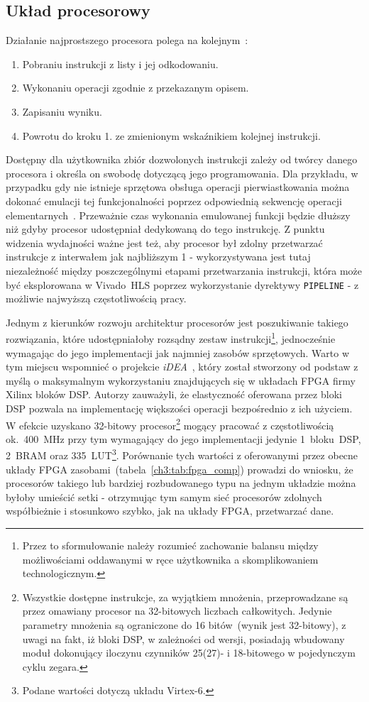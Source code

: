 \subsection{Układ procesorowy}
Działanie najprostszego procesora polega na kolejnym~\cite{RISCV}:
\begin{enumerate}
\item Pobraniu instrukcji z listy i jej odkodowaniu.
\item Wykonaniu operacji zgodnie z przekazanym opisem.
\item Zapisaniu wyniku.
\item Powrotu do kroku 1. ze zmienionym wskaźnikiem kolejnej instrukcji.
\end{enumerate}
Dostępny dla użytkownika zbiór dozwolonych instrukcji zależy od twórcy danego procesora i określa on swobodę dotyczącą jego programowania. Dla przykładu, w przypadku gdy nie istnieje sprzętowa obsługa operacji pierwiastkowania można dokonać emulacji tej funkcjonalności poprzez odpowiednią sekwencję operacji elementarnych~\cite{FAST_INV_SQRT}. Przeważnie czas wykonania emulowanej funkcji będzie dłuższy niż gdyby procesor udostępniał dedykowaną do tego instrukcję. Z punktu widzenia wydajności ważne jest też, aby procesor był zdolny przetwarzać instrukcje z interwałem jak najbliższym 1 - wykorzystywana jest tutaj niezależność między poszczególnymi etapami przetwarzania instrukcji, która może być eksplorowana w Vivado~HLS poprzez wykorzystanie dyrektywy \texttt{PIPELINE} - z  możliwie najwyższą częstotliwością pracy. 

Jednym z kierunków rozwoju architektur procesorów jest poszukiwanie takiego rozwiązania, które udostępniałoby rozsądny zestaw instrukcji\footnote{Przez to sformułowanie należy rozumieć zachowanie balansu między możliwościami oddawanymi w ręce użytkownika a skomplikowaniem technologicznym.}, jednocześnie wymagając do jego implementacji jak najmniej zasobów sprzętowych. Warto w tym miejscu wspomnieć o projekcie \textit{iDEA}~\cite{iDEA}, który został stworzony od podstaw z myślą o maksymalnym wykorzystaniu znajdujących się w układach FPGA firmy Xilinx bloków DSP. Autorzy zauważyli, że elastyczność oferowana przez bloki DSP pozwala na implementację większości operacji bezpośrednio z ich użyciem. W efekcie uzyskano 32-bitowy procesor\footnote{Wszystkie dostępne instrukcje, za wyjątkiem mnożenia, przeprowadzane są przez omawiany procesor na 32-bitowych liczbach całkowitych. Jedynie parametry mnożenia są ograniczone do 16 bitów~(wynik jest 32-bitowy), z uwagi na fakt, iż bloki DSP, w zależności od wersji, posiadają wbudowany moduł dokonujący iloczynu czynników 25(27)- i 18-bitowego w pojedynczym cyklu zegara.} mogący pracować z częstotliwością ok.~400~MHz przy tym wymagający do jego implementacji jedynie 1~bloku~DSP, 2~BRAM oraz 335~LUT\footnote{Podane wartości dotyczą układu Virtex-6.}. Porównanie tych wartości z oferowanymi przez obecne układy FPGA zasobami~(tabela~\ref{ch3:tab:fpga_comp})  prowadzi do wniosku, że procesorów takiego lub bardziej rozbudowanego typu na jednym układzie można byłoby umieścić setki - otrzymując tym samym sieć procesorów zdolnych współbieżnie i stosunkowo szybko, jak na układy FPGA, przetwarzać dane. 

